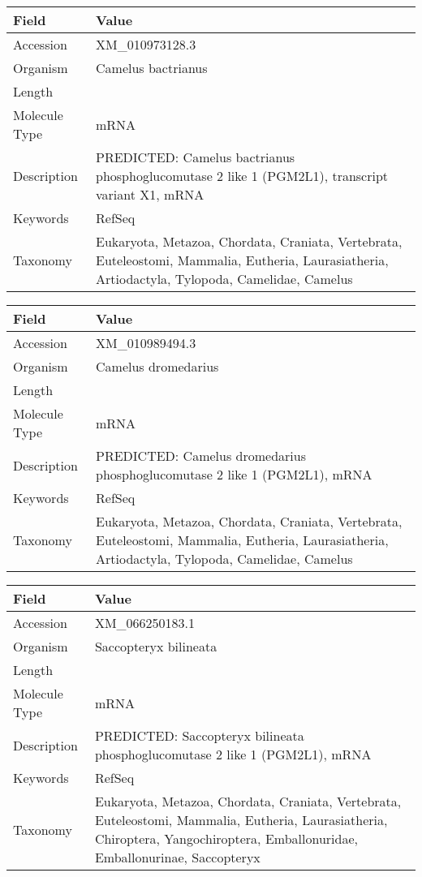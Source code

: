 \documentclass[10pt]{article}
\begin{document}
{\footnotesize
\begin{longtable}{>{\raggedright\arraybackslash}p{4.5cm} >{\raggedright\arraybackslash}p{11.5cm}}
\textbf{Field} & \textbf{Value} \\
\hline
Accession & XM\_010973128.3 \\
Organism & Camelus bactrianus \\
Length & 6990 \\
Molecule Type & mRNA \\
Description & PREDICTED: Camelus bactrianus phosphoglucomutase 2 like 1 (PGM2L1), transcript variant X1, mRNA \\
Keywords & RefSeq \\
Taxonomy & Eukaryota, Metazoa, Chordata, Craniata, Vertebrata, Euteleostomi, Mammalia, Eutheria, Laurasiatheria, Artiodactyla, Tylopoda, Camelidae, Camelus \\
\end{longtable}
}

{\footnotesize
\begin{longtable}{>{\raggedright\arraybackslash}p{4.5cm} >{\raggedright\arraybackslash}p{11.5cm}}
\textbf{Field} & \textbf{Value} \\
\hline
Accession & XM\_010989494.3 \\
Organism & Camelus dromedarius \\
Length & 6608 \\
Molecule Type & mRNA \\
Description & PREDICTED: Camelus dromedarius phosphoglucomutase 2 like 1 (PGM2L1), mRNA \\
Keywords & RefSeq \\
Taxonomy & Eukaryota, Metazoa, Chordata, Craniata, Vertebrata, Euteleostomi, Mammalia, Eutheria, Laurasiatheria, Artiodactyla, Tylopoda, Camelidae, Camelus \\
\end{longtable}
}

{\footnotesize
\begin{longtable}{>{\raggedright\arraybackslash}p{4.5cm} >{\raggedright\arraybackslash}p{11.5cm}}
\textbf{Field} & \textbf{Value} \\
\hline
Accession & XM\_066250183.1 \\
Organism & Saccopteryx bilineata \\
Length & 7821 \\
Molecule Type & mRNA \\
Description & PREDICTED: Saccopteryx bilineata phosphoglucomutase 2 like 1 (PGM2L1), mRNA \\
Keywords & RefSeq \\
Taxonomy & Eukaryota, Metazoa, Chordata, Craniata, Vertebrata, Euteleostomi, Mammalia, Eutheria, Laurasiatheria, Chiroptera, Yangochiroptera, Emballonuridae, Emballonurinae, Saccopteryx \\
\end{longtable}
}
\end{document}
